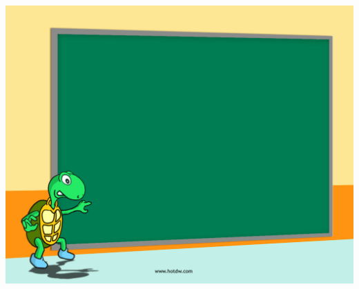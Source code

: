 \documentclass[mathserif, handout]{beamer}
\begin{document}
\usebackgroundtemplate
{
  \includegraphics[width=\paperwidth,height=\paperheight]{./figs/lastpage.jpg}%
}
\begin{frame}
  
  
  \vspace{2em}

\end{frame}
\end{document}
